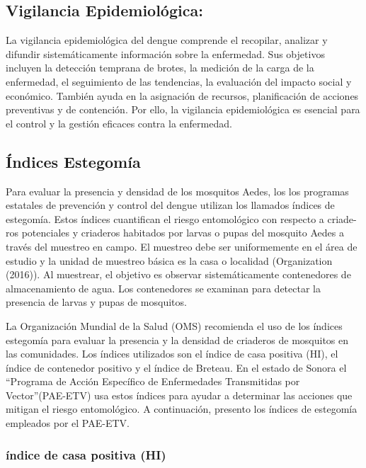 \documentclass[
  letterpaper,
  twocolumn,
  landscape]{report}
\begin{document}
\subsection{Vigilancia
Epidemiológica:}\label{vigilancia-epidemioluxf3gica}

La vigilancia epidemiológica del dengue comprende el recopilar, analizar
y difundir sistemáticamente información sobre la enfermedad. Sus
objetivos incluyen la detección temprana de brotes, la medición de la
carga de la enfermedad, el seguimiento de las tendencias, la evaluación
del impacto social y económico. También ayuda en la asignación de
recursos, planificación de acciones preventivas y de contención. Por
ello, la vigilancia epidemiológica es esencial para el control y la
gestión eficaces contra la enfermedad.

\subsection{Índices Estegomía}\label{uxedndices-estegomuxeda}

Para evaluar la presencia y densidad de los mosquitos Aedes, los los
programas estatales de prevención y control del dengue utilizan los
llamados índices de estegomía. Estos índices cuantifican el riesgo
entomológico con respecto a criade- ros potenciales y criaderos
habitados por larvas o pupas del mosquito Aedes a través del muestreo en
campo. El muestreo debe ser uniformemente en el área de estudio y la
unidad de muestreo básica es la casa o localidad (Organization (2016)).
Al muestrear, el objetivo es observar sistemáticamente contenedores de
almacenamiento de agua. Los contenedores se examinan para detectar la
presencia de larvas y pupas de mosquitos.

La Organización Mundial de la Salud (OMS) recomienda el uso de los
índices estegomía para evaluar la presencia y la densidad de criaderos
de mosquitos en las comunidades. Los índices utilizados son el índice de
casa positiva (HI), el índice de contenedor positivo y el índice de
Breteau. En el estado de Sonora el ``Programa de Acción Específico de
Enfermedades Transmitidas por Vector''(PAE-ETV) usa estos índices para
ayudar a determinar las acciones que mitigan el riesgo entomológico. A
continuación, presento los índices de estegomía empleados por el
PAE-ETV.

\subsubsection{índice de casa positiva
(HI)}\label{uxedndice-de-casa-positiva-hi}
\end{document}
